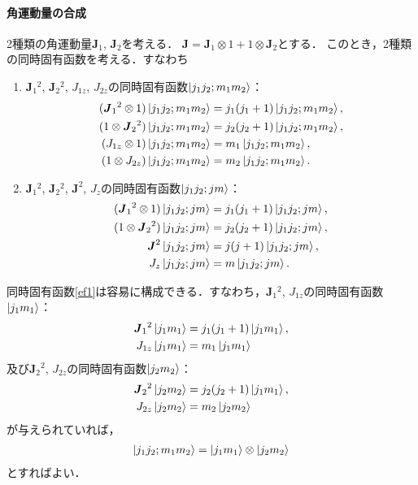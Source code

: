 \documentclass[a4paper]{ltjsreport}
\begin{document}
\paragraph{角運動量の合成}
2種類の角運動量$\boldsymbol{J}_1$, $\boldsymbol{J}_2$を考える．
$\boldsymbol{J} = \boldsymbol{J}_1 \otimes 1 + 1 \otimes \boldsymbol{J}_2$とする．
このとき，2種類の同時固有函数を考える．すなわち
\begin{enumerate}[label=ef \arabic*.]
  \item\label{ef1} $\boldsymbol{J}_1{}^2$, $\boldsymbol{J}_2{}^2$, $J_{1z}$, $J_{2z}$の同時固有函数$\ket{j_1j_2; m_1m_2}$：
  \begin{align}
    \begin{split}
      (\boldsymbol{J}_1{}^2 \otimes 1) \ket{j_1j_2; m_1m_2} & = j_1(j_1 + 1) \ket{j_1j_2; m_1m_2} , \\
      (1 \otimes \boldsymbol{J}_2{}^2) \ket{j_1j_2; m_1m_2} & = j_2(j_2 + 1) \ket{j_1j_2; m_1m_2} , \\
      (J_{1z} \otimes 1) \ket{j_1j_2; m_1m_2} & = m_1 \ket{j_1j_2; m_1m_2} , \\
      (1 \otimes J_{2z}) \ket{j_1j_2; m_1m_2} & = m_2 \ket{j_1j_2; m_1m_2} .
    \end{split}
  \end{align}

  \item $\boldsymbol{J}_1{}^2$, $\boldsymbol{J}_2{}^2$, $\boldsymbol{J}^2$, $J_z$の同時固有函数$\ket{j_1j_2; jm}$：
  \begin{align}
    \begin{split}
      (\boldsymbol{J}_1{}^2 \otimes 1) \ket{j_1j_2; jm} & = j_1(j_1 + 1) \ket{j_1j_2; jm} , \\
      (1 \otimes \boldsymbol{J}_2{}^2) \ket{j_1j_2; jm} & = j_2(j_2 + 1) \ket{j_1j_2; jm} , \\
      \boldsymbol{J}^2 \ket{j_1j_2; jm} & = j(j + 1) \ket{j_1j_2; jm} , \\
      J_z \ket{j_1j_2; jm} & = m \ket{j_1j_2; jm} .
    \end{split}
  \end{align}
\end{enumerate}

同時固有函数\ref{ef1}は容易に構成できる．すなわち，$\boldsymbol{J}_1{}^2$, $J_{1z}$の同時固有函数$\ket{j_1m_1}$：
\begin{align}
  \boldsymbol{J}_1{}^2 \ket{j_1m_1} & = j_1(j_1 + 1) \ket{j_1m_1} , \\
  J_{1z} \ket{j_1m_1} & = m_1 \ket{j_1m_1}
\end{align}
及び$\boldsymbol{J}_2{}^2$, $J_{2z}$の同時固有函数$\ket{j_2m_2}$：
\begin{align}
  \boldsymbol{J}_2{}^2 \ket{j_2m_2} & = j_2(j_2 + 1) \ket{j_1m_1} , \\
  J_{2z} \ket{j_2m_2} & = m_2 \ket{j_2m_2}
\end{align}
が与えられていれば，
\begin{align}
  \ket{j_1j_2; m_1m_2} = \ket{j_1m_1} \otimes \ket{j_2m_2}
\end{align}
とすればよい．
\end{document}
